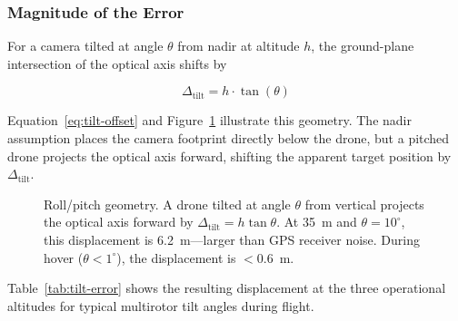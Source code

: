 \subsubsection{Magnitude of the Error}

For a camera tilted at angle $\theta$ from nadir at altitude $h$, the ground-plane intersection of the optical axis shifts by

\begin{equation}\label{eq:tilt-offset}
  \Delta_\mathrm{tilt} = h \cdot \tan(\theta)
\end{equation}

\noindent Equation~\ref{eq:tilt-offset} and Figure~\ref{fig:nadir-geometry} illustrate this geometry.  The nadir assumption places the camera footprint directly below the drone, but a pitched drone projects the optical axis forward, shifting the apparent target position by $\Delta_\mathrm{tilt}$.

\begin{figure}[H]
  \centering
  \caption{Roll/pitch geometry.  A drone tilted at angle $\theta$ from vertical projects the optical axis forward by $\Delta_\mathrm{tilt} = h\tan\theta$.  At \SI{35}{\metre} and $\theta = 10^{\circ}$, this displacement is \SI{6.2}{\metre}---larger than GPS receiver noise.  During hover ($\theta < 1^{\circ}$), the displacement is $<$\SI{0.6}{\metre}.}
  \label{fig:nadir-geometry}
\end{figure}

\noindent Table~\ref{tab:tilt-error} shows the resulting displacement at the three operational altitudes for typical multirotor tilt angles during flight.

